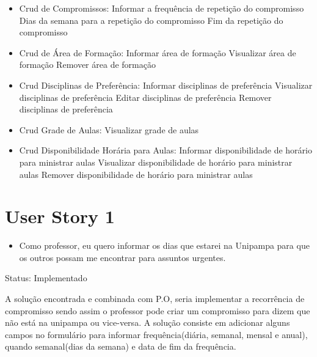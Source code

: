 \documentclass{abnt}
\begin{document}
			\begin{itemize} 
			\item Crud de Compromissos:
			\subitem Informar a frequência de repetição do compromisso
			\subitem Dias da semana para a repetição do compromisso
			\subitem Fim da repetição do compromisso
			
			\item Crud de Área de Formação:
			\subitem Informar área de formação
			\subitem Visualizar área de formação
			\subitem Remover área de formação
			
			\item Crud Disciplinas de Preferência:
			\subitem Informar disciplinas de preferência
			\subitem Visualizar disciplinas de preferência
			\subitem Editar disciplinas de preferência
			\subitem Remover disciplinas de preferência
			
			\item Crud Grade de Aulas:
			\subitem Visualizar grade de aulas
			
			\item Crud Disponibilidade Horária para Aulas:
			\subitem Informar disponibilidade de horário para ministrar aulas
			\subitem Visualizar disponibilidade de horário para ministrar aulas
			\subitem Remover disponibilidade de horário para ministrar aulas
			
			\end{itemize}
			
	\clearpage
	\section{User Story 1}
	
		\begin{itemize}
			\item Como professor, eu quero informar os dias que estarei na Unipampa para que os outros possam me encontrar para assuntos urgentes.
		\end{itemize}
		
		Status: Implementado
		
		A solução encontrada e combinada com P.O, seria implementar a recorrência de compromisso sendo assim o professor pode criar um compromisso para dizem que não está na unipampa ou vice-versa. A solução consiste em adicionar alguns campos no formulário para informar frequência(diária, semanal, mensal e anual), quando semanal(dias da semana) e data de fim da frequência.
		
\end{document}
